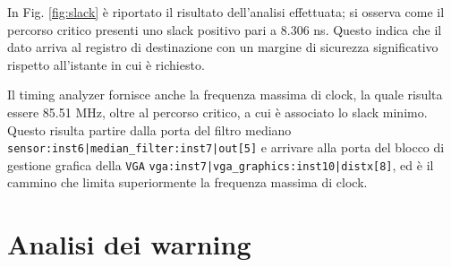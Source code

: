 \documentclass[reprint,amsmath,amssymb,aps,rmp,twoside]{revtex4-2}
\begin{document}
In Fig. \ref{fig:slack} è riportato il risultato dell'analisi effettuata; si osserva come il percorso critico presenti uno slack positivo pari a 8.306 ns. Questo indica che il dato arriva al registro di destinazione con un margine di sicurezza significativo rispetto all’istante in cui è richiesto.


Il timing analyzer fornisce anche la frequenza massima di clock, la quale risulta essere 85.51 MHz, oltre al percorso critico, a cui è associato lo slack minimo. Questo risulta partire dalla porta del filtro mediano {\color{blue}\texttt{sensor:inst6|median\_filter:inst7|out[5]}} e arrivare alla porta del blocco di gestione grafica della \texttt{VGA} {\color{blue}\texttt{vga:inst7|vga\_graphics:inst10|distx[8]}}, ed è il cammino che limita superiormente la frequenza massima di clock.


\vspace{0.5cm}  

\section{Analisi dei warning}
\end{document}
